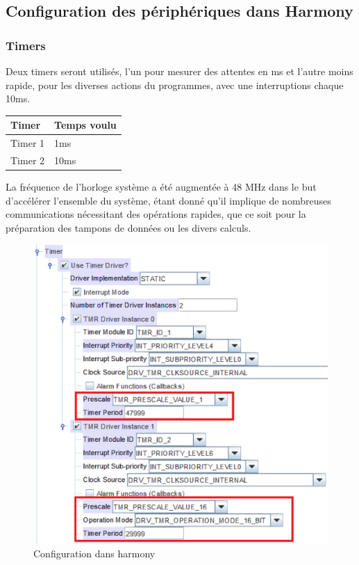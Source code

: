 \subsection{Configuration des périphériques dans Harmony}
{
	\subsubsection{Timers} 
	
	Deux timers seront utilisés, l'un pour mesurer des attentes en ms et l'autre moins rapide, pour les diverses actions du programmes, avec une interruptions chaque 10ms.
	\begin{table}[h]
		\centering
		\begin{tabular}{|l|l|}
			\hline
			Timer & Temps voulu \\
			\hline
			Timer 1 & 1ms \\
			\hline
			Timer 2 & 10ms \\
			\hline
		\end{tabular}
	\end{table}

	La fréquence de l'horloge système a été augmentée à 48 MHz dans le but d'accélérer l'ensemble du système, étant donné qu'il implique de nombreuses communications nécessitant des opérations rapides, que ce soit pour la préparation des tampons de données ou les divers calculs.
	
	\begin{figure}[h]
		\centering
		\includegraphics[width=0.55\linewidth]{Figures/Dev-SOFT/Timer_config}
		\caption{Configuration dans harmony}
		\label{fig:timerconfig}
	\end{figure}

}
